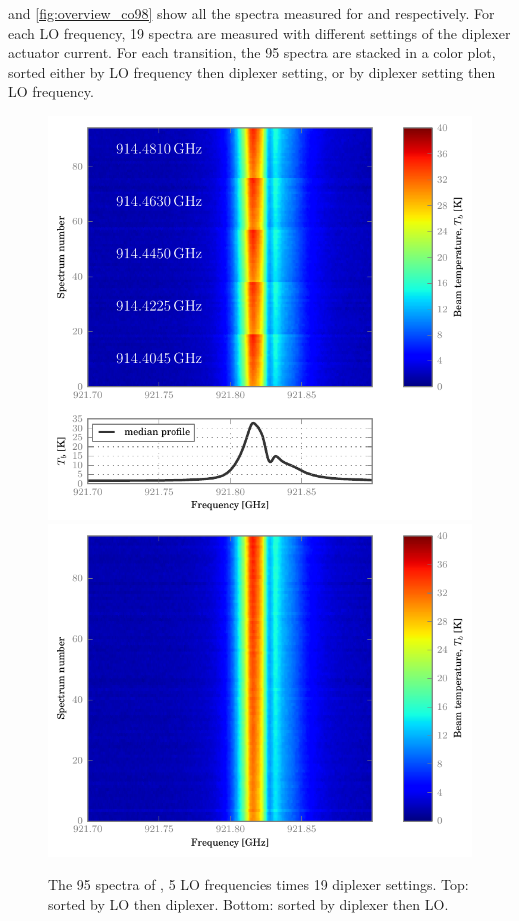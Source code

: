  and \cref{fig:overview_co98} show all the spectra measured for  and  respectively.
For each LO frequency, 19 spectra are measured with different settings of the diplexer actuator current.
For each transition, the 95 spectra are stacked in a color plot, sorted either by LO frequency then diplexer setting, or by diplexer setting then LO frequency.

\begin{figure}
    \centering
    \includegraphics[width=.9\textwidth]{overview_co87}
    \includegraphics[width=.9\textwidth]{overview_co87_flipped}
    \caption{The 95 spectra of , 5 LO frequencies times 19 diplexer settings.
    Top: sorted by LO then diplexer.  Bottom: sorted by diplexer then LO.}
    \label{fig:overview_co87}
\end{figure}

